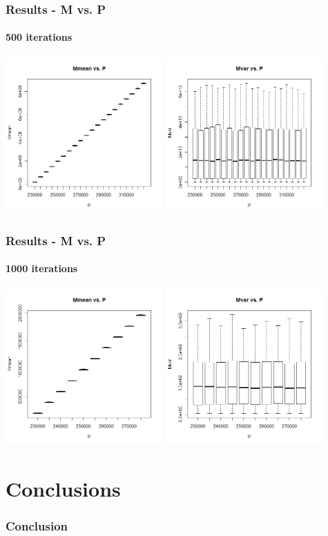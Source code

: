 \begin{frame}
    \frametitle{Results - M vs. P }
	\framesubtitle{500 iterations}
\hspace*{-5mm}
\includegraphics[height=6cm]{boxplot500_mmean_P}
\includegraphics[height=6cm]{boxplot500_mvar_P}
\end{frame}


\begin{frame}
    \frametitle{Results - M vs. P }
	\framesubtitle{1000 iterations}
\hspace*{-5mm}
\includegraphics[height=6cm]{boxplot1000_mmean_P}
\includegraphics[height=6cm]{boxplot1000_mvar_P}
\end{frame}







\section{Conclusions}

\begin{frame}
    \frametitle{Conclusion}
\end{frame}




